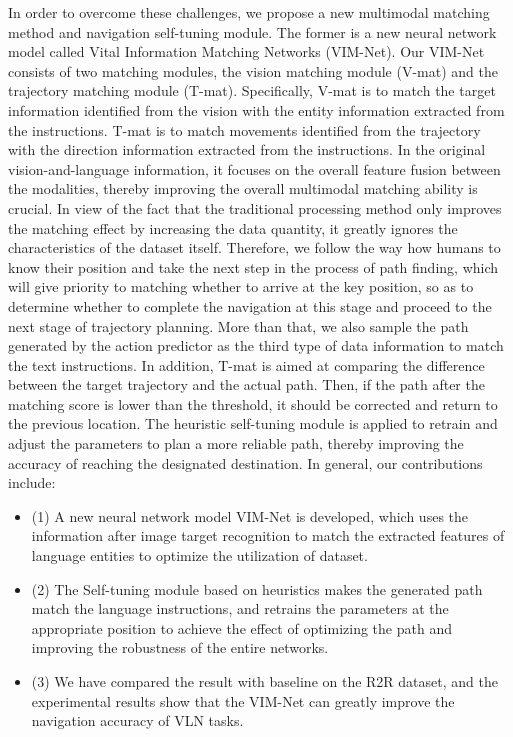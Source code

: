 In order to overcome these challenges, we propose a new multimodal matching method and navigation self-tuning module. The former is a new neural network model called Vital Information Matching Networks (VIM-Net). Our VIM-Net consists of two matching modules, the vision matching module (V-mat) and the trajectory matching module (T-mat). Specifically, V-mat is to match the target information identified from the vision with the entity information extracted from the instructions. T-mat is to match movements identified from the trajectory with the direction information extracted from the instructions. In the original vision-and-language information, it focuses on the overall feature fusion between the modalities, thereby improving the overall multimodal matching ability is crucial. In view of the fact that the traditional processing method only improves the matching effect by increasing the data quantity, it greatly ignores the characteristics of the dataset itself. Therefore, we follow the way how humans to know their position and take the next step in the process of path finding, which will give priority to matching whether to arrive at the key position, so as to determine whether to complete the navigation at this stage and proceed to the next stage of trajectory planning. More than that, we also sample the path generated by the action predictor as the third type of data information to match the text instructions. In addition, T-mat is aimed at comparing the difference between the target trajectory and the actual path. Then, if the path after the matching score is lower than the threshold, it should be corrected and return to the previous location. The heuristic self-tuning module is applied to retrain and adjust the parameters to plan a more reliable path, thereby improving the accuracy of reaching the designated destination. In general, our contributions include:

\begin{itemize}
		\item[](1) A new neural network model VIM-Net is developed, which uses the information after image target recognition to match the extracted features of language entities to optimize the utilization of dataset.
		\item[](2) The Self-tuning module based on heuristics makes the generated path match the language instructions, and retrains the parameters at the appropriate position to achieve the effect of optimizing the path and improving the robustness of the entire networks.
		\item[](3) We have compared the result with baseline on the R2R dataset, and the experimental results show that the VIM-Net can greatly improve the navigation accuracy of VLN tasks.
\end{itemize}
